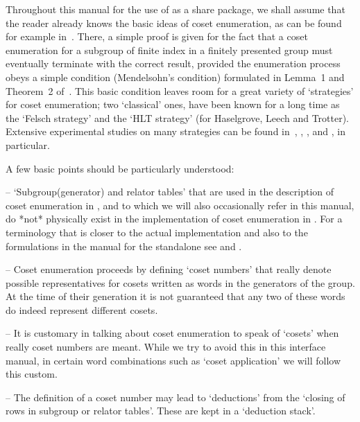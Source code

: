 Throughout this manual for  the  use  of  {\ACE}  as  a  {\GAP}  share
package, we shall assume that the reader already knows the basic ideas
of coset enumeration, as can be  found  for  example  in~\cite{Neu82}.
There, a simple proof is given for the fact that a  coset  enumeration
for a subgroup of finite index in  a  finitely  presented  group  must
eventually terminate with the correct result, provided the enumeration
process obeys a simple condition (Mendelsohn's  condition)  formulated
in Lemma~1 and Theorem~2 of~\cite{Neu82}. This basic condition  leaves
room for a great variety of \lq{}strategies'  for  coset  enumeration;
two \lq{}classical' ones, have been known  for  a  long  time  as  the
\lq{}Felsch strategy' and  the  \lq{}HLT  strategy'  (for  Haselgrove,
Leech and Trotter). Extensive experimental studies on many  strategies
can  be  found  in~\cite{CDHW73},  \cite{Hav91},   \cite{HR99a},   and
\cite{HR99b}, in particular.

A few basic points should be particularly understood:

\beginlist

\item{--} \lq{}Subgroup(generator) and relator tables' that  are  used
in the description of coset enumeration in \cite{Neu82}, and to  which
we will also occasionally refer in this manual,  do  *not*  physically
exist in the implementation of coset  enumeration  in  {\ACE}.  For  a
terminology that is closer to the actual implementation  and  also  to
the  formulations  in  the  manual  for  the  {\ACE}  standalone   see
\cite{CDHW73} and \cite{Hav91}.

\item{--} Coset enumeration proceeds by defining  \lq{}coset  numbers'
that really denote possible  representatives  for  cosets  written  as
words in the generators of the group. At the time of their  generation
it is not guaranteed that any two of these words do  indeed  represent
different cosets.

\item{--} It is customary in  talking about coset enumeration to speak
of \lq{}cosets' when really coset  numbers are meant. While  we try to
avoid this in this interface manual, in certain word combinations such
as \lq{}coset application' we will follow this custom.

\item{--} The   definition   of   a   coset   number   may   lead   to
\lq{}deductions' from the \lq{}closing of rows in subgroup or  relator
tables'. These are kept in a \lq{}deduction stack'.


